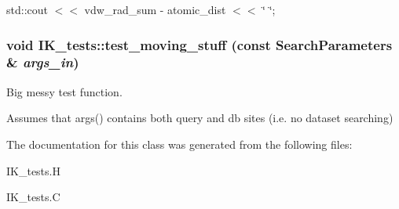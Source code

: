 std::cout $<$$<$ vdw\_\-rad\_\-sum - atomic\_\-dist $<$$<$ \char`\"{} \char`\"{}; 
\subsubsection{\setlength{\rightskip}{0pt plus 5cm}void IK\_\-tests::test\_\-moving\_\-stuff (const \bf{Search\-Parameters} \& {\em args\_\-in})}\label{classSimSite3D_1_1IK__tests_f4fdeb2d068d4b958a999d2c2673c183}


Big messy test function. 

Assumes that args() contains both query and db sites (i.e. no dataset searching) 

The documentation for this class was generated from the following files:\begin{CompactItemize}
\item 
IK\_\-tests.H\item 
IK\_\-tests.C\end{CompactItemize}

